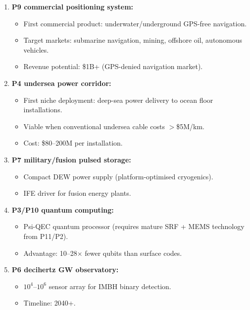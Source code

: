 \documentclass[11pt]{article}
\begin{document}
\begin{tcolorbox}[colback=blue!5!white, colframe=blue!60!black,
  title=\textbf{Phase IV: Full-Scale Deployment}]

\begin{enumerate}
\item \textbf{P9 commercial positioning system:}
  \begin{itemize}[nosep]
    \item First commercial product: underwater/underground GPS-free
      navigation.
    \item Target markets: submarine navigation, mining, offshore oil,
      autonomous vehicles.
    \item Revenue potential: \$1B+ (GPS-denied navigation market).
  \end{itemize}

\item \textbf{P4 undersea power corridor:}
  \begin{itemize}[nosep]
    \item First niche deployment: deep-sea power delivery to ocean
      floor installations.
    \item Viable when conventional undersea cable costs $>$\$5M/km.
    \item Cost: \$80--200M per installation.
  \end{itemize}

\item \textbf{P7 military/fusion pulsed storage:}
  \begin{itemize}[nosep]
    \item Compact DEW power supply (platform-optimised cryogenics).
    \item IFE driver for fusion energy plants.
  \end{itemize}

\item \textbf{P3/P10 quantum computing:}
  \begin{itemize}[nosep]
    \item Psi-QEC quantum processor (requires mature SRF + MEMS
      technology from P11/P2).
    \item Advantage: 10--28$\times$ fewer qubits than surface codes.
  \end{itemize}

\item \textbf{P6 decihertz GW observatory:}
  \begin{itemize}[nosep]
    \item $10^4$--$10^6$ sensor array for IMBH binary detection.
    \item Timeline: 2040+.
  \end{itemize}
\end{enumerate}
\end{tcolorbox}
\end{document}
